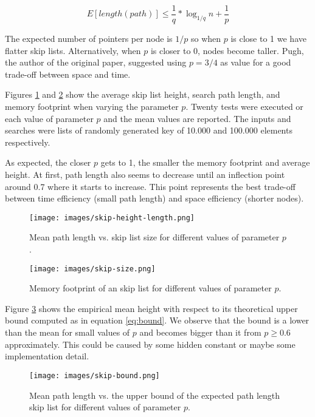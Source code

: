\documentclass[a4paper,10pt,table,xcdraw]{article}
\begin{document}
\begin{equation} \label{eq:bound}
E[length(path)] \leq \frac{1}{q} * \log_{1/q} n + \frac{1}{p}
\end{equation}

The expected number of pointers per node is $1/p$ so when $p$ is close to 1 we have flatter skip lists. Alternatively, when $p$ is closer to 0, nodes become taller. Pugh, the author of the original paper, suggested using $p = 3/4$ as value for a good trade-off between space and time. 

\label{test-sl}
Figures \ref{fig:skip-height} and \ref{fig:skip-size} show the average skip list height, search path length, and memory footprint when varying the parameter $p$. Twenty tests were executed or each value of parameter $p$ and the mean values are reported. The inputs and searches were lists of randomly generated key of 10.000 and 100.000 elements respectively. 

As expected, the closer $p$ gets to 1, the smaller the memory footprint and average height. At first, path length also seems to decrease until an inflection point around 0.7 where it starts to increase. This point represents the best trade-off between time efficiency (small path length) and space efficiency (shorter nodes).

\begin{figure}[H]
\centering
\texttt{[image: images/skip-height-length.png]}
\caption{Mean path length vs. skip list size for different values of parameter $p$.}
\label{fig:skip-height}
\end{figure}

\begin{figure}[H]
\centering
\texttt{[image: images/skip-size.png]}
\caption{Memory footprint of an skip list for different values of parameter $p$.}
\label{fig:skip-size}
\end{figure}

Figure \ref{fig:skip-bound} shows the empirical mean height with respect to its theoretical upper bound computed as in equation \ref{eq:bound}. We observe that the bound is a lower than the mean for small values of $p$ and becomes bigger than it from $p \geq 0.6$ approximately. This could be caused by some hidden constant or maybe some implementation detail.



\begin{figure}[H]
\centering
\texttt{[image: images/skip-bound.png]}
\caption{Mean path length vs. the upper bound of the expected path length skip list for different values of parameter $p$.}
\label{fig:skip-bound}
\end{figure}
\end{document}
